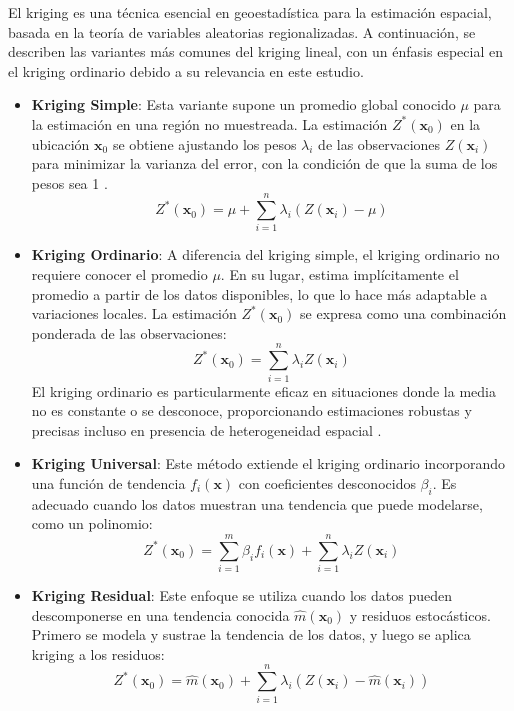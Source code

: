 El kriging es una técnica esencial en geoestadística para la estimación espacial, basada en la teoría de variables aleatorias regionalizadas. A continuación, se describen las variantes más comunes del kriging lineal, con un énfasis especial en el kriging ordinario debido a su relevancia en este estudio.

\begin{itemize}
    \item \textbf{Kriging Simple}: Esta variante supone un promedio global conocido \(\mu\) para la estimación en una región no muestreada. La estimación \(Z^*(\mathbf{x}_0)\) en la ubicación \(\mathbf{x}_0\) se obtiene ajustando los pesos \(\lambda_i\) de las observaciones \(Z(\mathbf{x}_i)\) para minimizar la varianza del error, con la condición de que la suma de los pesos sea 1 \cite{Viera2002}.
    \[
    Z^*(\mathbf{x}_0) = \mu + \sum_{i=1}^{n} \lambda_i (Z(\mathbf{x}_i) - \mu)
    \]
    
    \item \textbf{Kriging Ordinario}: A diferencia del kriging simple, el kriging ordinario no requiere conocer el promedio \(\mu\). En su lugar, estima implícitamente el promedio a partir de los datos disponibles, lo que lo hace más adaptable a variaciones locales. La estimación \(Z^*(\mathbf{x}_0)\) se expresa como una combinación ponderada de las observaciones:
    \[
    Z^*(\mathbf{x}_0) = \sum_{i=1}^{n} \lambda_i Z(\mathbf{x}_i)
    \]
    El kriging ordinario es particularmente eficaz en situaciones donde la media no es constante o se desconoce, proporcionando estimaciones robustas y precisas incluso en presencia de heterogeneidad espacial \cite{Viera2002}.
    
    \item \textbf{Kriging Universal}: Este método extiende el kriging ordinario incorporando una función de tendencia \(f_i(\mathbf{x})\) con coeficientes desconocidos \(\beta_i\). Es adecuado cuando los datos muestran una tendencia que puede modelarse, como un polinomio:
    \[
    Z^*(\mathbf{x}_0) = \sum_{i=1}^{m} \beta_i f_i(\mathbf{x}) + \sum_{i=1}^{n} \lambda_i Z(\mathbf{x}_i)
    \]
    
    \item \textbf{Kriging Residual}: Este enfoque se utiliza cuando los datos pueden descomponerse en una tendencia conocida \(\hat{m}(\mathbf{x}_0)\) y residuos estocásticos. Primero se modela y sustrae la tendencia de los datos, y luego se aplica kriging a los residuos:
    \[
    Z^*(\mathbf{x}_0) = \hat{m}(\mathbf{x}_0) + \sum_{i=1}^{n} \lambda_i (Z(\mathbf{x}_i) - \hat{m}(\mathbf{x}_i))
    \]
\end{itemize}

